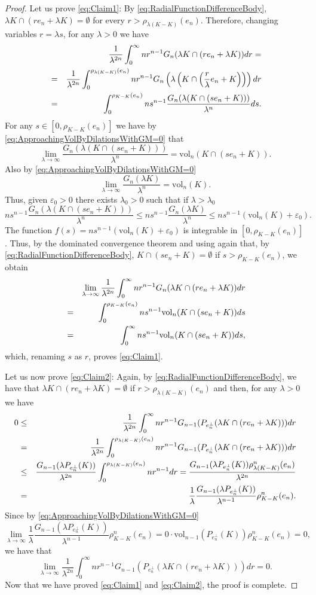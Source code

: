 \documentclass[10pt]{amsart}
\def\vol{\mathrm{vol}}
\numberwithin{equation}{section}
\begin{document}
\begin{proof}
Let us prove \eqref{eq:Claim1}: By \eqref{eq:RadialFunctionDifferenceBody}, $\lambda K\cap(re_n+\lambda K)=\emptyset$ for every $r>\rho_{\lambda(K-K)}(e_n)$. Therefore, changing variables $r=\lambda s$, for any $\lambda>0$ we have
\begin{eqnarray*}
&&\frac{1}{\lambda^{2n}}\int_0^\infty nr^{n-1}G_n(\lambda K\cap(re_n+\lambda K))dr=\cr
&=&\frac{1}{\lambda^{2n}}\int_0^{\rho_{\lambda(K-K)}(e_n)} nr^{n-1}G_n\left(\lambda\left( K\cap\left(\frac{r}{\lambda} e_n+ K\right)\right)\right)dr\cr
&=&\int_0^{\rho_{K-K}(e_n)} ns^{n-1}\frac{G_n(\lambda(K\cap(s e_n+ K)))}{\lambda^n}ds.\cr
\end{eqnarray*}
For any $s\in[0,\rho_{K-K}(e_n)]$ we have by \eqref{eq:ApproachingVolByDilationsWithGM=0} that
$$
\lim_{\lambda\to\infty}\frac{G_n(\lambda(K\cap(s e_n+ K)))}{\lambda^n}=\vol_n(K\cap (se_n+K)).
$$
Also by \eqref{eq:ApproachingVolByDilationsWithGM=0}
$$
\lim_{\lambda\to\infty}\frac{G_n(\lambda K)}{\lambda^n}=\vol_n(K).
$$
Thus, given $\varepsilon_0>0$ there exists $\lambda_0>0$ such that if $\lambda>\lambda_0$
$$
ns^{n-1}\frac{G_n(\lambda(K\cap(s e_n+ K)))}{\lambda^n}\leq ns^{n-1}\frac{G_n(\lambda K)}{\lambda^n}\leq ns^{n-1}(\vol_n(K)+\varepsilon_0).
$$
The function $f(s)=ns^{n-1}(\vol_n(K)+\varepsilon_0)$ is integrable in $[0,\rho_{K-K}(e_n)]$. Thus, by the dominated convergence theorem and using again that, by \eqref{eq:RadialFunctionDifferenceBody}, $K\cap(se_n+ K)=\emptyset$ if $s>\rho_{K-K}(e_n)$, we obtain
\begin{eqnarray*}
&&\lim_{\lambda\to\infty}\frac{1}{\lambda^{2n}}\int_0^\infty nr^{n-1}G_n(\lambda K\cap(re_n+\lambda K))dr\cr
&=&\int_0^{\rho_{K-K}(e_n)}ns^{n-1}\vol_n(K\cap(se_n+ K))ds\cr
&=&\int_0^{\infty}ns^{n-1}\vol_n(K\cap(se_n+ K))ds,\cr
\end{eqnarray*}
which, renaming $s$ as $r$, proves \eqref{eq:Claim1}.

Let us now prove \eqref{eq:Claim2}: Again, by \eqref{eq:RadialFunctionDifferenceBody}, we have that $\lambda K\cap(re_n+\lambda K)=\emptyset$ if $r>\rho_{\lambda(K-K)}(e_n)$ and then, for any $\lambda>0$ we have
\begin{eqnarray*}
0&\leq&\frac{1}{\lambda^{2n}}\int_0^\infty nr^{n-1}G_{n-1}(P_{e_n^\perp}(\lambda K\cap(re_n+\lambda K)))dr\cr
&=&\frac{1}{\lambda^{2n}}\int_0^{\rho_{\lambda(K-K)}(e_n)} nr^{n-1}G_{n-1}(P_{e_n^\perp}(\lambda K\cap(re_n+\lambda K)))dr\cr
&\leq& \frac{G_{n-1}(\lambda P_{e_n^\perp}(K))}{\lambda^{2n}}\int_0^{\rho_{\lambda(K-K)}(e_n)}nr^{n-1}dr=\frac{G_{n-1}(\lambda P_{e_n^\perp}(K))\rho_{\lambda(K-K)}^n(e_n)}{\lambda^{2n}}\cr
&=&\frac{1}{\lambda}\frac{G_{n-1}(\lambda P_{e_n^\perp}(K))}{\lambda^{n-1}}\rho_{K-K}^n(e_n).
\end{eqnarray*}
Since by \eqref{eq:ApproachingVolByDilationsWithGM=0}
$$
\lim_{\lambda\to\infty}\frac{1}{\lambda}\frac{G_{n-1}(\lambda P_{e_n^\perp}(K))}{\lambda^{n-1}}\rho_{K-K}^n(e_n)=0\cdot\vol_{n-1}(P_{e_n^\perp}(K))\rho_{K-K}^n(e_n)=0,
$$
we have that
$$
\lim_{\lambda\to\infty}\frac{1}{\lambda^{2n}}\int_0^\infty nr^{n-1}G_{n-1}(P_{e_n^\perp}(\lambda K\cap(re_n+\lambda K)))dr=0.
$$
Now that we have proved \eqref{eq:Claim1} and \eqref{eq:Claim2}, the proof is complete.
\end{proof}
\end{document}

